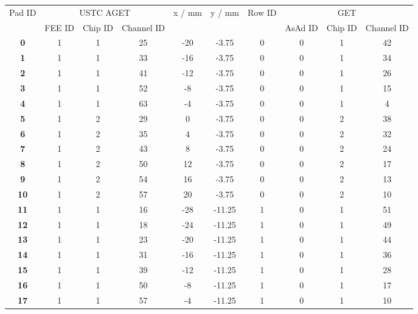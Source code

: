 \documentclass{article}%
\begin{document}
\begin{longtable}{cccccccccc}
    
        \hline
        \multirow{2}{*}{\scriptsize{Pad ID}} & \multicolumn{3}{c}{{USTC AGET}} & \multirow{2}{*}{\scriptsize{x / mm}} & \multirow{2}{*}{\scriptsize{y / mm}} & \multirow{2}{*}{\scriptsize{Row ID}} & \multicolumn{3}{c}{{GET}} \\   \cline{2-4} \cline{8-10}

          & \scriptsize{FEE ID} & \scriptsize{Chip ID} & \scriptsize{Channel ID} &  &  &  & \scriptsize{AsAd ID} & \scriptsize{Chip ID} & \scriptsize{Channel ID} \\   \hline
        \textbf{0} & 1 & 1 & 25 & -20 & -3.75 & 0 & 0 & 1 & 42 \\ 
        \textbf{1} & 1 & 1 & 33 & -16 & -3.75 & 0 & 0 & 1 & 34 \\ 
        \textbf{2} & 1 & 1 & 41 & -12 & -3.75 & 0 & 0 & 1 & 26 \\ 
        \textbf{3} & 1 & 1 & 52 & -8 & -3.75 & 0 & 0 & 1 & 15 \\ 
        \textbf{4} & 1 & 1 & 63 & -4 & -3.75 & 0 & 0 & 1 & 4 \\ 
        \textbf{5} & 1 & 2 & 29 & 0 & -3.75 & 0 & 0 & 2 & 38 \\ 
        \textbf{6} & 1 & 2 & 35 & 4 & -3.75 & 0 & 0 & 2 & 32 \\ 
        \textbf{7} & 1 & 2 & 43 & 8 & -3.75 & 0 & 0 & 2 & 24 \\ 
        \textbf{8} & 1 & 2 & 50 & 12 & -3.75 & 0 & 0 & 2 & 17 \\ 
        \textbf{9} & 1 & 2 & 54 & 16 & -3.75 & 0 & 0 & 2 & 13 \\ 
        \textbf{10} & 1 & 2 & 57 & 20 & -3.75 & 0 & 0 & 2 & 10 \\ 
        \textbf{11} & 1 & 1 & 16 & -28 & -11.25 & 1 & 0 & 1 & 51 \\ 
        \textbf{12} & 1 & 1 & 18 & -24 & -11.25 & 1 & 0 & 1 & 49 \\ 
        \textbf{13} & 1 & 1 & 23 & -20 & -11.25 & 1 & 0 & 1 & 44 \\ 
        \textbf{14} & 1 & 1 & 31 & -16 & -11.25 & 1 & 0 & 1 & 36 \\ 
        \textbf{15} & 1 & 1 & 39 & -12 & -11.25 & 1 & 0 & 1 & 28 \\ 
        \textbf{16} & 1 & 1 & 50 & -8 & -11.25 & 1 & 0 & 1 & 17 \\ 
        \textbf{17} & 1 & 1 & 57 & -4 & -11.25 & 1 & 0 & 1 & 10 \\ 

\end{longtable}
\end{document}
